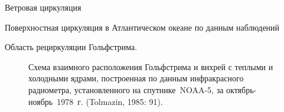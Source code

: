 \begin{chapter}{Ветровая циркуляция}
\begin{section}{Поверхностная циркуляция в Атлантическом океане по данным наблюдений}
\begin{paragraph}{Область рециркуляции Гольфстрима.}
\begin{figure}[t!]
\caption{Схема взаимного расположения  
Гольфстрима и вихрей с теплыми и холодными ядрами, 
построенная по данным инфракрасного радиометра, установленного на 
спутнике~NOAA-5, за октябрь-ноябрь~1978~г. (Tolmazin, 1985: 91).}
\label{fig:ringsmap}
\end{figure}
%
%


\end{paragraph}
\end{section}
\end{chapter}
